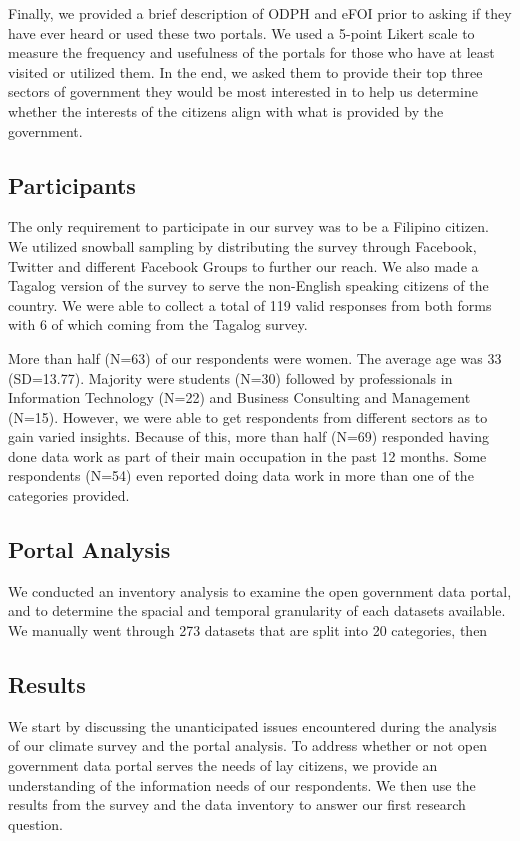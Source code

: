 \documentclass{sigchi}
\begin{document}
Finally, we provided a brief description of ODPH and eFOI prior to asking if they have ever heard or used these two portals. We used a 5-point Likert scale to measure the frequency and usefulness of the portals for those who have at least visited or utilized them. In the end, we asked them to provide their top three sectors of government they would be most interested in to help us determine whether the interests of the citizens align with what is provided by the government.

\subsection{Participants}
The only requirement to participate in our survey was to be a Filipino citizen. We utilized snowball sampling by distributing the survey through Facebook, Twitter and different Facebook Groups to further our reach. We also made a Tagalog version of the survey to serve the non-English speaking citizens of the country. We were able to collect a total of 119 valid responses from both forms with 6 of which coming from the Tagalog survey.

More than half (N=63) of our respondents were women. The average age was 33 (SD=13.77). Majority were students (N=30) followed by professionals in Information Technology (N=22) and Business Consulting and Management (N=15). However, we were able to get respondents from different sectors as to gain varied insights. Because of this, more than half (N=69) responded having done data work as part of their main occupation in the past 12 months. Some respondents (N=54) even reported doing data work in more than one of the categories provided.

\subsection{Portal Analysis}
We conducted an inventory analysis to examine the open government data portal, and to determine the spacial and temporal granularity of each datasets available. We manually went through 273 datasets that are split into 20 categories, then 

\subsection{Results}
We start by discussing the unanticipated issues encountered during the analysis of our climate survey and the portal analysis. To address whether or not open government data portal serves the needs of lay citizens, we provide an understanding of the information needs of our respondents. We then use the results from the survey and the data inventory to answer our first research question.
\end{document}

